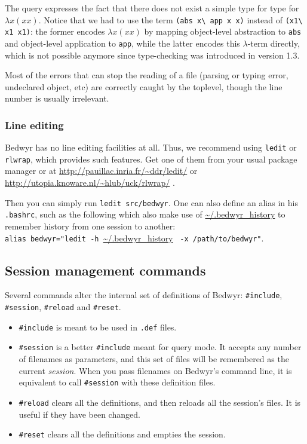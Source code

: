 \documentclass{article}
\begin{document}
The query expresses the fact that there does not exist a simple type for
type for $\lambda x (x x)$.
Notice that we had to use the term \verb+(abs x\ app x x)+ instead of
\verb+(x1\ x1 x1)+: the former encodes $\lambda x (x x)$ by mapping
object-level abstraction to {\tt abs} and object-level application to
{\tt app}, while the latter encodes this $\lambda$-term directly,
which is not possible anymore since type-checking was introduced in
version 1.3.

Most of the errors that can stop the reading of a file (parsing or
typing error, undeclared object, etc) are correctly caught by the
toplevel, though the line number is usually irrelevant.

\subsubsection{Line editing}

Bedwyr has no line editing facilities at all. Thus, we recommend using
\texttt{ledit} or \texttt{rlwrap}, which provides such features. Get one
of them from your usual package manager or at
\urldef{\thisurl}\url{http://pauillac.inria.fr/~ddr/ledit/}\ahrefurl{\thisurl}
or \urldef{\thisurl}\url{http://utopia.knoware.nl/~hlub/uck/rlwrap/}
\ahrefurl{\thisurl}.


Then you can simply run \verb.ledit src/bedwyr.. One can also define
an alias in his \verb;.bashrc;, such as the following which also
make use of \url{~/.bedwyr_history} to remember history from one session to
another:\\
\verb|alias bedwyr="ledit -h |\url{~/.bedwyr_history}%
\verb| -x /path/to/bedwyr"|.

\subsection{Session management commands}

Several commands alter the internal set of definitions of Bedwyr:
\verb.#include., \verb.#session., \verb.#reload. and \verb.#reset..
\begin{itemize}
  \item
    \verb.#include. is meant to be used in \verb;.def; files.
  \item
    \verb.#session. is a better \verb.#include. meant for query mode.
    It accepts any number of filenames as parameters, and this set of files
    will be remembered as the current \emph{session}.
    When you pass filenames on Bedwyr's command line,
    it is equivalent to call \verb.#session. with these definition files.
  \item
    \verb.#reload. clears all the definitions,
    and then reloads all the session's files. It is useful if they have
    been changed.
  \item
    \verb.#reset. clears all the definitions and empties the session.
\end{itemize}
\end{document}
